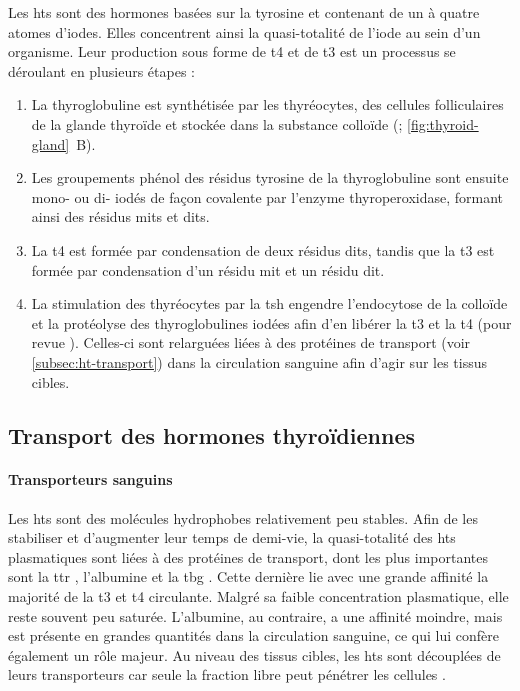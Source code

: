 \documentclass[../main.tex]{subfiles}
\begin{document}
Les \glspl{ht} sont des hormones basées sur la tyrosine et contenant de un à quatre atomes d'iodes.
Elles concentrent ainsi la quasi-totalité de l'iode au sein d'un organisme.
Leur production sous forme de \gls{t4} et de \gls{t3} est un processus se déroulant en plusieurs étapes :
\begin{enumerate}
\item La thyroglobuline est synthétisée par les thyréocytes, des cellules folliculaires de la glande thyroïde et stockée dans la substance colloïde (\citealp{Lissitzky1981}; \autoref{fig:thyroid-gland}~B).
\item Les groupements phénol des résidus tyrosine de la thyroglobuline sont ensuite mono- ou di- iodés de façon covalente par l'enzyme thyroperoxidase, formant ainsi des résidus \glspl{mit} et \glspl{dit}.
\item La \gls{t4} est formée par condensation de deux résidus \glspl{dit}, tandis que la \gls{t3} est formée par condensation d'un résidu \gls{mit} et un résidu \gls{dit}.
\item La stimulation des thyréocytes par la \gls{tsh} engendre l'endocytose de la colloïde et la protéolyse des thyroglobulines iodées afin d'en libérer la \gls{t3} et la \gls{t4} (pour revue \citealp{Rousset2003}).
Celles-ci sont relarguées liées à des protéines de transport (voir \autoref{subsec:ht-transport}) dans la circulation sanguine afin d'agir sur les tissus cibles.
\end{enumerate}


\subsection{Transport des hormones thyroïdiennes}\label{subsec:ht-transport}

\paragraph{Transporteurs sanguins}
Les \glspl{ht} sont des molécules hydrophobes relativement peu stables.
Afin de les stabiliser et d'augmenter leur temps de demi-vie, la quasi-totalité des \glspl{ht} plasmatiques sont liées à des protéines de transport, dont les plus importantes sont la \gls{ttr} \citep{Palha2002}, l'albumine et la \gls{tbg} \citep{Schussler2000}.
Cette dernière lie avec une grande affinité la majorité de la \gls{t3} et \gls{t4} circulante.
Malgré sa faible concentration plasmatique, elle reste souvent peu saturée.
L'albumine, au contraire, a une affinité moindre, mais est présente en grandes quantités dans la circulation sanguine, ce qui lui confère également un rôle majeur.
Au niveau des tissus cibles, les \glspl{ht} sont découplées de leurs transporteurs car seule la fraction libre peut pénétrer les cellules \citep{Ekins1994}.
\end{document}
